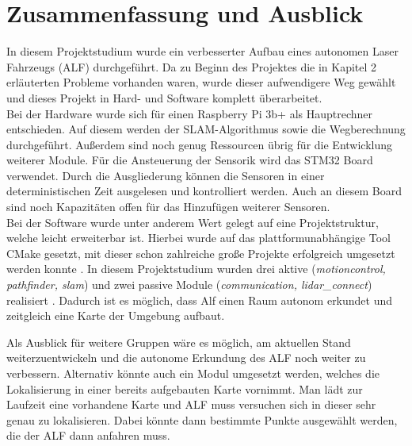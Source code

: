 \chapter{Zusammenfassung und Ausblick}


In diesem Projektstudium wurde ein verbesserter Aufbau eines autonomen Laser Fahrzeugs (ALF) durchgeführt. Da zu Beginn des Projektes die in Kapitel 2 erläuterten Probleme vorhanden waren, wurde dieser aufwendigere Weg gewählt und dieses Projekt in Hard- und Software komplett überarbeitet.\\
Bei der Hardware wurde sich für einen Raspberry Pi 3b+ als Hauptrechner entschieden. Auf diesem werden der SLAM-Algorithmus sowie die Wegberechnung durchgeführt. Außerdem sind noch genug Ressourcen übrig für die Entwicklung weiterer Module. Für die Ansteuerung der Sensorik wird das STM32 Board verwendet. Durch die Ausgliederung können die Sensoren in einer deterministischen Zeit ausgelesen und kontrolliert werden. Auch an diesem Board sind noch Kapazitäten offen für das Hinzufügen weiterer Sensoren.\\
Bei der Software wurde unter anderem Wert gelegt auf eine Projektstruktur, welche leicht erweiterbar ist. Hierbei wurde auf das plattformunabhängige Tool CMake gesetzt, mit dieser schon zahlreiche große Projekte erfolgreich umgesetzt werden konnte \cite{cmake.2018}. In diesem Projektstudium wurden drei aktive (\textit{motioncontrol, pathfinder, slam}) und zwei passive Module (\textit{communication, lidar\_connect}) realisiert . Dadurch ist es möglich, dass Alf einen Raum autonom erkundet und zeitgleich eine Karte der Umgebung aufbaut.

Als Ausblick für weitere Gruppen wäre es möglich, am aktuellen Stand weiterzuentwickeln und die autonome Erkundung des ALF noch weiter zu verbessern. Alternativ könnte auch ein Modul umgesetzt werden, welches die Lokalisierung in einer bereits aufgebauten Karte vornimmt. Man lädt zur Laufzeit eine vorhandene Karte und ALF muss versuchen sich in dieser sehr genau zu lokalisieren. Dabei könnte dann bestimmte Punkte ausgewählt werden, die der ALF dann anfahren muss.
